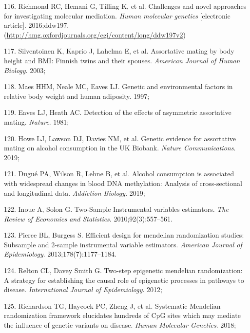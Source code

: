 \documentclass[11pt,oneside]{bristolthesis}
\newenvironment{cslreferences}%
  {}%
  {\par}
\begin{document}
\begin{cslreferences}
\leavevmode\hypertarget{ref-Richmond2016}{}%
116. Richmond RC, Hemani G, Tilling K, et al. Challenges and novel approaches for investigating molecular mediation. \emph{Human molecular genetics} {[}electronic article{]}. 2016;ddw197. (\url{http://hmg.oxfordjournals.org/cgi/content/long/ddw197v2})

\leavevmode\hypertarget{ref-Silventoinen2003}{}%
117. Silventoinen K, Kaprio J, Lahelma E, et al. Assortative mating by body height and BMI: Finnish twins and their spouses. \emph{American Journal of Human Biology}. 2003;

\leavevmode\hypertarget{ref-Maes1997}{}%
118. Maes HHM, Neale MC, Eaves LJ. Genetic and environmental factors in relative body weight and human adiposity. 1997;

\leavevmode\hypertarget{ref-Eaves1981}{}%
119. Eaves LJ, Heath AC. Detection of the effects of asymmetric assortative mating. \emph{Nature}. 1981;

\leavevmode\hypertarget{ref-Howe2019}{}%
120. Howe LJ, Lawson DJ, Davies NM, et al. Genetic evidence for assortative mating on alcohol consumption in the UK Biobank. \emph{Nature Communications}. 2019;

\leavevmode\hypertarget{ref-Dugue2019}{}%
121. Dugué PA, Wilson R, Lehne B, et al. Alcohol consumption is associated with widespread changes in blood DNA methylation: Analysis of cross-sectional and longitudinal data. \emph{Addiction Biology}. 2019;

\leavevmode\hypertarget{ref-Inoue2010}{}%
122. Inoue A, Solon G. Two-Sample Instrumental variables estimators. \emph{The Review of Economics and Statistics}. 2010;92(3):557--561.

\leavevmode\hypertarget{ref-Pierce2013}{}%
123. Pierce BL, Burgess S. Efficient design for mendelian randomization studies: Subsample and 2-sample instrumental variable estimators. \emph{American Journal of Epidemiology}. 2013;178(7):1177--1184.

\leavevmode\hypertarget{ref-Relton2012}{}%
124. Relton CL, Davey Smith G. Two-step epigenetic mendelian randomization: A strategy for establishing the causal role of epigenetic processes in pathways to disease. \emph{International Journal of Epidemiology}. 2012;

\leavevmode\hypertarget{ref-Richardson2018}{}%
125. Richardson TG, Haycock PC, Zheng J, et al. Systematic Mendelian randomization framework elucidates hundreds of CpG sites which may mediate the influence of genetic variants on disease. \emph{Human Molecular Genetics}. 2018;


\end{cslreferences}
\end{document}
